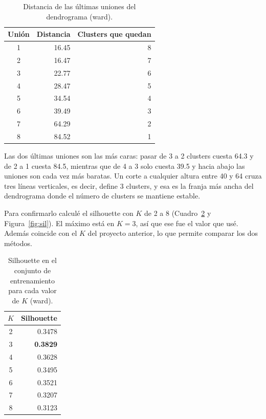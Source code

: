 \documentclass[11pt,a4paper]{article}
\begin{document}
\begin{table}[H]
  \centering
  \begin{tabular}{crr}
    \toprule
    Unión & Distancia & Clusters que quedan \\
    \midrule
    1 & 16.45 & 8 \\
    2 & 16.47 & 7 \\
    3 & 22.77 & 6 \\
    4 & 28.47 & 5 \\
    5 & 34.54 & 4 \\
    6 & 39.49 & 3 \\
    7 & 64.29 & 2 \\
    8 & 84.52 & 1 \\
    \bottomrule
  \end{tabular}
  \caption{Distancia de las últimas uniones del dendrograma (ward).}
  \label{tab:uniones}
\end{table}

Las dos últimas uniones son las más caras: pasar de 3 a 2 clusters cuesta 64.3 y de 2 a 1 cuesta 84.5, mientras que de 4 a 3 solo cuesta 39.5 y hacia abajo las uniones son cada vez más baratas. Un corte a cualquier altura entre 40 y 64 cruza tres líneas verticales, es decir, define 3 clusters, y esa es la franja más ancha del dendrograma donde el número de clusters se mantiene estable.

Para confirmarlo calculé el silhouette con $K$ de 2 a 8 (Cuadro~\ref{tab:sil} y Figura~\ref{fig:sil}). El máximo está en $K=3$, así que ese fue el valor que usé. Además coincide con el $K$ del proyecto anterior, lo que permite comparar los dos métodos.

\begin{table}[H]
  \centering
  \begin{tabular}{cr}
    \toprule
    $K$ & Silhouette \\
    \midrule
    2 & 0.3478 \\
    3 & \textbf{0.3829} \\
    4 & 0.3628 \\
    5 & 0.3495 \\
    6 & 0.3521 \\
    7 & 0.3207 \\
    8 & 0.3123 \\
    \bottomrule
  \end{tabular}
  \caption{Silhouette en el conjunto de entrenamiento para cada valor de $K$ (ward).}
  \label{tab:sil}
\end{table}
\end{document}
